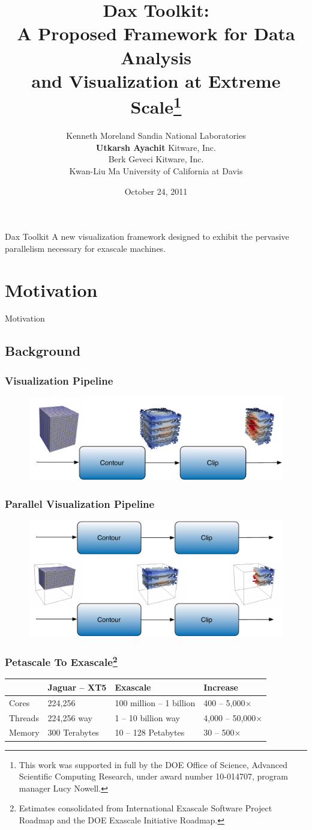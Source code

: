 \documentclass[brown]{beamer}
\title{\textbf{Dax Toolkit}: \\
  A Proposed Framework for Data Analysis \\
  and Visualization at Extreme Scale\footnote
    {
  This work was supported in full by the DOE Office of Science, Advanced
  Scientific Computing Research, under award number 10-014707, program manager
  Lucy Nowell.
    }
}
\author{\small
  Kenneth Moreland {\tiny Sandia National Laboratories} \\
  \textbf{Utkarsh Ayachit} {\tiny Kitware, Inc. } \\
  Berk Geveci {\tiny Kitware, Inc. }\\
  Kwan-Liu Ma {\tiny University of California at Davis}
}
\date {October 24, 2011}
\newcommand\mysection[1]{
  \section{#1}
  \begin{frame}
    \begin{center}{\LARGE
      #1
      }
    \end{center}
  \end{frame}
}
\begin{document}
\frame{\titlepage}

\frame
{
  \begin{beamerboxesrounded}{Dax Toolkit}
  A new visualization framework designed to exhibit the pervasive parallelism
    necessary for exascale machines.
  \end{beamerboxesrounded}
}

\mysection{Motivation}
\subsection{Background}

\frame
{
  \frametitle{Visualization Pipeline}
  \begin{figure}
  \centering
  \includegraphics[width=.8\textwidth]{images/SimplePipeline.pdf}
  \end{figure}
}

\frame
{
  \frametitle{Parallel Visualization Pipeline}
  \begin{figure}
  \centering
  \includegraphics[width=.8\textwidth]{images/ParallelVisPipeline.pdf}
  \end{figure}
}


\frame
{
  \frametitle{Petascale To Exascale\footnote[1]{Estimates consolidated from International
  Exascale Software Project Roadmap and the DOE Exascale Initiative Roadmap.}}
  \renewcommand{\arraystretch}{1.5}
  \begin{table}[htbp]
    \centering
    \begin{tabular}{l|l|l|l}
      & Jaguar -- XT5 & Exascale & Increase \\
      \hline
      Cores & 224,256
      & 100 million -- 1 billion
      & 400 -- 5,000$\times$ \\
      Threads & 224,256 way
      & 1 -- 10 billion way
      & 4,000 -- 50,000$\times$ \\
      Memory & 300 Terabytes
      & 10 -- 128  Petabytes
      & 30 -- 500$\times$
    \end{tabular}
  \end{table}
}
\end{document}
